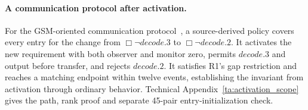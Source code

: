 \paragraph{A communication protocol after activation.}
\label{sec:gsm-entry-derivation}
For the GSM-oriented communication protocol~\cite[Sec.~6.4]{Nahabedian2020}, a source-derived policy covers every entry for the change from $\Box\neg decode.3$ to $\Box\neg decode.2$. It activates the new requirement with both observer and monitor zero, permits $decode.3$ and output before transfer, and rejects $decode.2$. It satisfies R1's gap restriction and reaches a matching endpoint within twelve events, establishing the invariant from activation through ordinary behavior. Technical Appendix~\ref{ta:activation_scope} gives the path, rank proof and separate 45-pair entry-initialization check.
